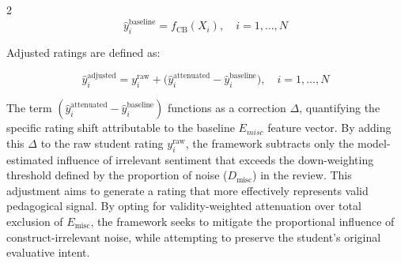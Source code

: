 \documentclass{article}
\begin{document}
\begin{multicols*}{2}
\begin{equation}
\hat{y}_i^\text{baseline} = f_\mathrm{CB}(X_i), \quad i = 1, \dots, N
\end{equation}\newline

Adjusted ratings are defined as:

\begin{equation}
\hat{y}_i^\text{adjusted} = y_i^\text{raw} + \big( \hat{y}_i^\text{attenuated} - \hat{y}_i^\text{baseline}\big), \quad i = 1, \dots, N
\end{equation}\newline

The term $(\hat{y}_i^\text{attenuated} - \hat{y}_i^\text{baseline})$ functions as a correction $\Delta$, quantifying the specific rating shift attributable to the baseline $E_{misc}$ feature vector. By adding this $\Delta$ to the raw student rating $y_i^\text{raw}$, the framework subtracts only the model-estimated influence of irrelevant sentiment that exceeds the down-weighting threshold defined by the proportion of noise ($D_\text{misc}$) in the review. This adjustment aims to generate a rating that more effectively represents valid pedagogical signal. By opting for validity-weighted attenuation over total exclusion of $E_\text{misc}$, the framework seeks to mitigate the proportional influence of construct-irrelevant noise, while attempting to preserve the student’s original evaluative intent.


\end{multicols*}
\end{document}
